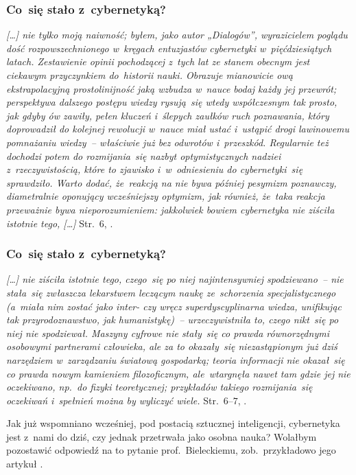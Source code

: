 \documentclass[10pt,t]{beamer}
\begin{document}
\begin{frame}
  \frametitle{Co~się stało z~cybernetyką?}


  \textit{[\ldots] nie tylko moją naiwność; byłem, jako autor „Dialogów”,
    wyrazicielem poglądu dość
    rozpowszechnionego w~kręgach entuzjastów cybernetyki w~pięćdziesiątych
    latach. Zestawienie opinii pochodzącej z~tych lat ze stanem obecnym jest
    ciekawym przyczynkiem do~historii nauki. Obrazuje mianowicie ową
    ekstrapolacyjną prostolinijność jaką wzbudza w~nauce bodaj każdy jej
    przewrót; perspektywa dalszego postępu wiedzy rysują~się wtedy
    współczesnym tak prosto, jak gdyby ów zawiły, pełen kluczeń i~ślepych
    zaułków ruch poznawania, który doprowadził do kolejnej rewolucji
    w~nauce miał ustać i~ustąpić drogi lawinowemu pomnażaniu wiedzy~--
    właściwie już bez odwrotów i~przeszkód. Regularnie też dochodzi potem
    do rozmijania~się nazbyt optymistycznych nadziei z~rzeczywistością,
    które to zjawisko i~w~odniesieniu do cybernetyki~się sprawdziło. Warto
    dodać, że~reakcją na nie bywa później pesymizm poznawczy, diametralnie
    oponujący wcześniejszy optymizm, jak również, że~taka reakcja przeważnie
    bywa nieporozumieniem: jakkolwiek bowiem cybernetyka nie ziściła
    istotnie tego, [\ldots]}
  Str.~$6$, \parencite{Lem-Dialogi-Vol-I-Pub-1996}.

\end{frame}





\begin{frame}
  \frametitle{Co~się stało z~cybernetyką?}


  \textit{[\ldots] nie ziściła istotnie tego, czego~się po niej najintensywniej
    spodziewano~-- nie stała~się zwłaszcza lekarstwem leczącym naukę
    ze~schorzenia specjalistycznego (a~miała nim zostać jako inter- czy
    wręcz superdyscyplinarna wiedza, unifikując tak przyrodoznawstwo, jak
    humanistykę)~-- urzeczywistniła to, czego nikt~się po niej nie
    spodziewał. Maszyny cyfrowe nie stały~się co prawda równorzędnymi
    osobowymi partnerami człowieka, ale za to okazały~się niezastąpionym
    już dziś narzędziem w~zarządzaniu światową gospodarką; teoria
    informacji nie okazał~się co prawda nowym kamieniem filozoficznym,
    ale~wtargnęła nawet tam gdzie jej nie oczekiwano, np.~do fizyki
    teoretycznej; przykładów takiego rozmijania~się oczekiwań i~spełnień
    można by wyliczyć wiele.}
  Str.~$6\text{--}7$, \parencite{Lem-Dialogi-Vol-I-Pub-1996}.

  Jak już wspomniano wcześniej, pod postacią sztucznej inteligencji,
  cybernetyka jest z~nami do dziś, czy jednak przetrwała jako osobna nauka?
  Wolałbym pozostawić odpowiedź na to pytanie prof.~Bieleckiemu,
  zob.~przykładowo jego artykuł
  \parencite{Bielecki-Cybernetyka-Slowniki-spoleczne-Vol-XIII-Ver-2025}.

\end{frame}
\end{document}
